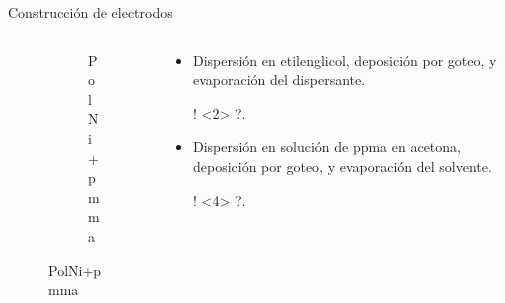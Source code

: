 \documentclass[aspectratio=169]{beamer}
\begin{document}
\begin{frame}{Construcción de electrodos}
\begin{columns}
\begin{column}{0.3\textwidth}
\begin{figure}
{\begin{subfigure}[b]{\electrodesWidth}
						\caption{PolNi+pmma}
					\end{subfigure}}
				\end{figure}
			\end{column}
			\begin{column}{0.6\textwidth}
				\begin{itemize}
					\item<1-2> Dispersión en etilenglicol, deposición por goteo, y evaporación del dispersante.
					\item[!]<2> ?.
					\item<3-4> Dispersión en solución de ppma en acetona, deposición por goteo, y evaporación del solvente.
					\item[!]<4> ?.
				\end{itemize}
			\end{column}
		\end{columns}		
	\end{frame}
	
\end{document}
